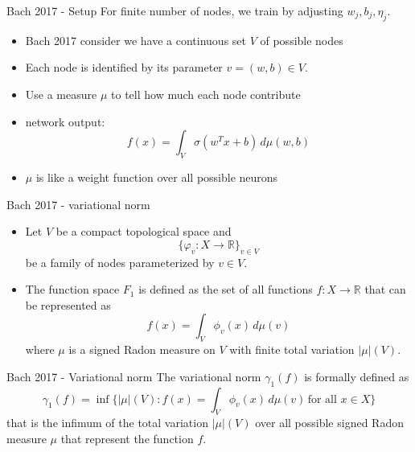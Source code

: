 \documentclass[aspectratio=169]{beamer} %
\begin{document}
\begin{frame}{Bach 2017 - Setup}
For finite number of nodes, we train by adjusting $w_j, b_j, \eta_j$.
\begin{itemize}
    \item Bach 2017 consider we have a continuous set $V$ of possible nodes
    \item Each node is identified by its parameter $v=(w,b)\in V$.
    \item Use a measure $\mu$ to tell how much each node contribute
    \item network output: 
    $$
    f(x) = \int_V \sigma(w^T x+b)\,d\mu(w,b)
    $$
    \item $\mu$ is like a weight function over all possible neurons
\end{itemize}
    
\end{frame}
\begin{frame}{Bach 2017 - variational norm}
\begin{itemize}
    \item Let $V$ be a compact topological space and 
    $$
    \{\varphi_v: X\to\mathbb{R}\}_{v\in V}
    $$
    be a family of nodes parameterized by $v\in V$.
    \item The function space $F_1$ is defined as the set of all functions $f:X\to\mathbb{R}$ that can be represented as
    $$
    f(x) = \int_V \phi_v(x)\, d\mu(v)
    $$
    where $\mu$ is a signed Radon measure on $V$ with finite total variation $|\mu|(V)$.
\end{itemize}
    
\end{frame}
\begin{frame}{Bach 2017 - Variational norm}
The variational norm $\gamma_1(f)$ is formally defined as
$$
\gamma_1(f) = \inf\{|\mu|(V): f(x)= \int_V\phi_v(x)\, d\mu(v)\,\text{for all $x\in X$}\}
$$
that is the infimum of the total variation $|\mu|(V)$ over all possible signed Radon measure $\mu$ that represent the function $f$.
    
\end{frame}
\end{document}
